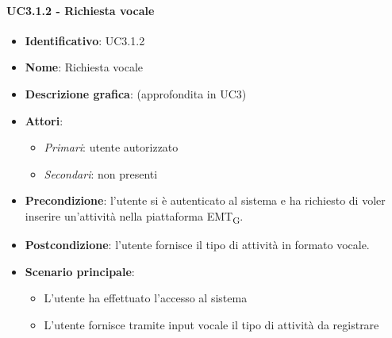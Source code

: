 \paragraph{UC3.1.2 - Richiesta vocale}
\begin{itemize}
   \item \textbf{Identificativo}: UC3.1.2
   \item \textbf{Nome}: Richiesta vocale
   \item \textbf{Descrizione grafica}: (approfondita in UC3)
   \item \textbf{Attori}:
   \begin{itemize} 
       \item \textit{Primari}: utente autorizzato
       \item \textit{Secondari}: non presenti
   \end{itemize}
       \item \textbf{Precondizione}: l'utente si è autenticato al sistema e ha richiesto di voler inserire un'attività nella piattaforma EMT\textsubscript{G}. 
       \item \textbf{Postcondizione}: l'utente fornisce il tipo di attività in formato vocale. 
    \item \textbf{Scenario principale}: 
       \begin{itemize}
           \item L'utente ha effettuato l'accesso al sistema 
           \item L'utente fornisce tramite input vocale il tipo di attività da  registrare
       \end{itemize}
\end{itemize}

